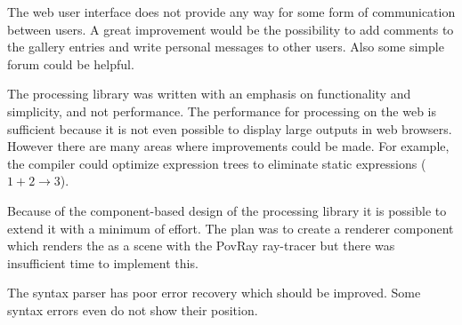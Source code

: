 The web user interface does not provide any way for some form of communication between users.
A great improvement would be the possibility to add comments to the gallery entries and write personal messages to other users.
Also some simple forum could be helpful.

The \lsystem processing library was written with an emphasis on functionality and simplicity, and not performance.
The performance for processing \lsystem on the web is sufficient because it is not even possible to display large outputs in web browsers.
However there are many areas where improvements could be made.
For example, the compiler could optimize expression trees to eliminate static expressions ($1 + 2 \rightarrow 3$).

Because of the component-based design of the \lsystem processing library it is possible to extend it with a minimum of effort.
The plan was to create a renderer component which renders the \lsystems as a scene with the PovRay ray-tracer but there was insufficient time to implement this.

The syntax parser has poor error recovery which should be improved.
Some syntax errors even do not show their position.
































